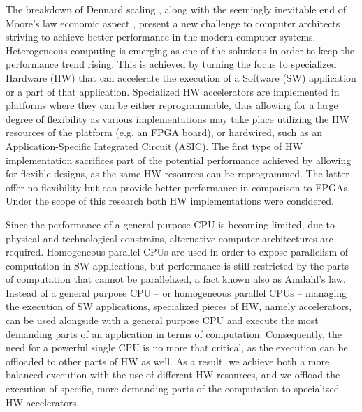 \documentclass[]{usiinfthesis}
\begin{document}
The breakdown of Dennard scaling \cite{esmaeilzadeh2011dark}, along with the seemingly inevitable 
end of Moore's law economic aspect \cite{simonite2016moore}, present a new challenge to computer 
architects striving to achieve
better performance in the modern computer systems.
Heterogeneous computing is emerging as one of the solutions in order to keep the performance 
trend rising. This is achieved by turning the focus to specialized Hardware (HW) that 
can accelerate the execution of a Software (SW) application or a part of that application. Specialized HW 
accelerators are implemented in platforms where they can be either reprogrammable, 
thus allowing for a large degree of flexibility as various implementations may take place utilizing
the HW resources of the platform (e.g. an FPGA board), or hardwired, such as an Application-Specific Integrated 
Circuit (ASIC). The first type of HW implementation sacrifices part of the potential 
performance achieved by allowing for flexible designs, as the same HW resources can be reprogrammed.
The latter offer no flexibility but can provide better performance in comparison to FPGAs. Under 
the scope of this research both HW implementations were considered.  \par
%
%
Since the performance of a general purpose CPU is becoming limited, due to physical and technological 
constrains, alternative computer architectures are required. Homogeneous parallel CPUs are used in 
order to expose parallelism of computation in SW applications, but performance is still restricted 
by the parts of computation that cannot be parallelized, a fact known also as Amdahl's law.
Instead of a 
general purpose CPU -- or homogeneous parallel CPUs -- managing the execution of SW applications, 
specialized pieces
of HW, namely accelerators, can be used alongside with a general purpose CPU and execute the
most demanding parts of an application in terms of computation. Consequently, the need for 
a powerful single CPU is no more that critical, as the execution can be offloaded to other
parts of HW as well. %
As a result, we achieve both a more balanced execution with 
the use of different HW resources, and we offload the execution of specific, more demanding 
parts of the computation to specialized HW accelerators.\par
\end{document}
